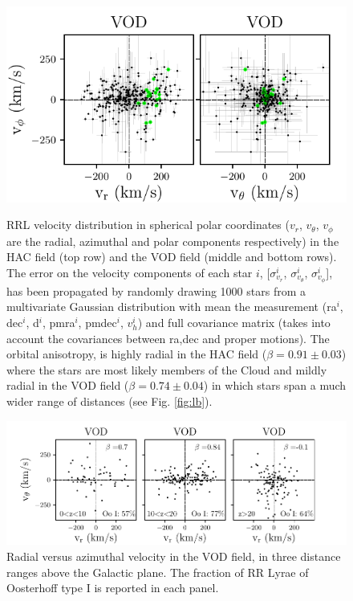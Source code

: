 \documentclass[fleqn,usenatbib]{mnras}
\begin{document}
\begin{figure}
  \hspace{-0.25cm}
    \includegraphics[scale=0.545]{VOD_velocities_vtheta.pdf}   \\
\vspace{-0.3cm}
    \caption{RRL velocity distribution in spherical polar coordinates ($v_{r}$, $v_{\theta}$, $v_{\phi}$  are the radial, azimuthal and polar components respectively) in the HAC field (top row) and the VOD field (middle and bottom rows). The error on the velocity components of each star $i $, [$\sigma^{i}_{v_{r}}$, $\sigma^{i}_{v_{\theta}}$, $\sigma^{i}_{v_{\phi}}$], has been propagated by randomly drawing 1000 stars from a multivariate Gaussian distribution with mean the measurement (ra$^{i}$, dec$^{i}$, d$^{i}$, pmra$^{i}$, pmdec$^{i}$, $v^{i}_{h}$) and full covariance matrix (takes into account the covariances between ra,dec and proper motions). The orbital anisotropy, is highly radial in the HAC field ($\beta = 0.91 \pm 0.03$) where the stars are most likely members of the Cloud and mildly radial in the VOD field ($\beta = 0.74 \pm 0.04$) in which stars span a much wider range of distances (see Fig. \ref{fig:lb}). }
    \label{fig:vel}
\end{figure}
%
\begin{figure}
	\hspace{-0.3cm}
	        \includegraphics[scale=0.555]{VOD_velocities_vphi_zcuts.pdf}
\vspace{-0.4cm}
   \caption{Radial versus azimuthal velocity in the VOD field, in three distance ranges above the Galactic plane. The fraction of RR Lyrae of Oosterhoff type I is reported in each panel. }
    \label{fig:VOD_vel}
\end{figure}
\end{document}
